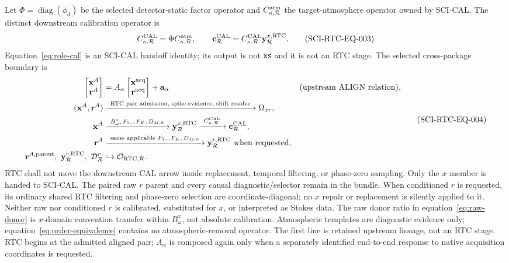 Let $\Phi=\operatorname{diag}(\phi_d)$ be the selected detector-static factor
operator and $C^{\rm atm}_{\kappa,\mathcal R}$ the target-atmosphere operator
owned by SCI-CAL.  The distinct downstream calibration operator is
\begin{equation}
 C^{\rm CAL}_{\kappa,\mathcal R}
 =\Phi C^{\rm atm}_{\kappa,\mathcal R},
 \qquad
 \mathbf c^{\rm CAL}_{\mathcal R}
 =C^{\rm CAL}_{\kappa,\mathcal R}\mathbf y^{x,\rm RTC}_{\mathcal R}.
 \tag{SCI-RTC-EQ-003}\label{eq:role-cal}
\end{equation}
Equation~\eqref{eq:role-cal} is an SCI-CAL handoff identity; its output is not
\texttt{xs} and it is not an RTC stage.  The selected cross-package boundary is
\begin{equation}
\begin{aligned}
 \begin{bmatrix}\mathbf x^A\\ \mathbf r^A\end{bmatrix}
   &=A_\alpha
     \begin{bmatrix}\mathbf x^{\rm acq}\\ \mathbf r^{\rm acq}\end{bmatrix}
     +\mathbf a_\alpha
     &&\text{(upstream ALIGN relation)},\\
 (\mathbf x^{A},\mathbf r^{A})
   &\xrightarrow{\ \text{RTC pair admission, spike evidence, shift resolve}\ }
     \Omega_{xr},\\
 \mathbf x^{A}
   &\xrightarrow{\ B^x_\omega,\,F_1\ldots F_K,\,D_{M,0}\ }
     \mathbf y^{x,\rm RTC}_{\mathcal R}
     \xrightarrow{\ C^{\rm CAL}_{\kappa,\mathcal R}\ }
     \mathbf c^{\rm CAL}_{\mathcal R},\\
 \mathbf r^{A}
   &\xrightarrow{\ \text{same applicable }F_1\ldots F_K,\,D_{M,0}\ }
     \mathbf y^{r,\rm RTC}_{\mathcal R}\ \text{when requested},\\
 \mathbf r^{A,\rm parent},\ \mathbf y^{r,\rm RTC}_{\mathcal R},\
 \mathcal D^r_{\mathcal R}
   &\hookrightarrow\mathcal O_{\rm RTC,\mathcal R}.
\end{aligned}
 \tag{SCI-RTC-EQ-004}\label{eq:order-equivalence}
\end{equation}
RTC shall not move the downstream CAL arrow inside replacement, temporal
filtering, or phase-zero sampling.  Only the $x$ member is handed to
SCI-CAL.  The paired raw $r$ parent and every causal diagnostic/selector remain
in the bundle.  When conditioned $r$ is requested, its ordinary shared RTC
filtering and phase-zero selection are coordinate-diagonal; no $x$ repair or
replacement is silently applied to it.  Neither raw nor conditioned $r$ is
calibrated, substituted for $x$, or interpreted as Stokes data.  The raw donor
ratio in equation~\eqref{eq:raw-donor} is
$x$-domain convention transfer within $B^x_\omega$, not absolute calibration.
Atmospheric templates are diagnostic evidence only; equation~\eqref{eq:order-equivalence}
contains no atmospheric-removal operator.
The first line is retained upstream lineage, not an RTC stage.  RTC begins at
the admitted aligned pair; $A_\alpha$ is composed again only when a separately
identified end-to-end response to native acquisition coordinates is requested.

